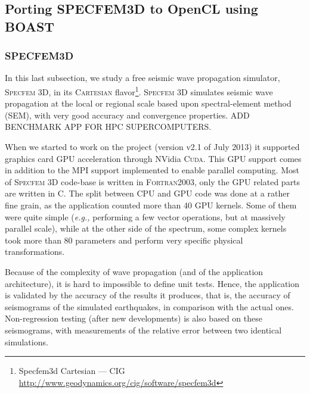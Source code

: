 \newcommand{\productname}[1]{\textsc{#1}}
\newcommand{\latin}[1]{\textit{#1}}

\newcommand{\Specfem}{\productname{Specfem 3D}\xspace}
\newcommand{\Cuda}{\productname{Cuda}\xspace}
\newcommand{\eg}{\latin{e.g.,}\xspace}
\newcommand{\OCL}{\productname{OpenCL}\xspace}
\newcommand{\code}[1]{\texttt{#1}}

\newcommand{\etc}[1]{\latin{etc}}


\subsection{Porting SPECFEM3D to OpenCL using BOAST}

\subsubsection{SPECFEM3D}

In this last subsection, we study a free seismic wave propagation
simulator, \Specfem, in its \productname{Cartesian}
flavor\footnote{Specfem3d Cartesian --- CIG
  \url{http://www.geodynamics.org/cig/software/specfem3d}}. \Specfem
simulates seismic wave propagation at the local or regional scale
based upon spectral-element method (SEM), with very good accuracy and
convergence properties. ADD BENCHMARK APP FOR HPC SUPERCOMPUTERS.

When we started to work on the project (version v2.1 of July 2013) it
supported graphics card GPU acceleration through NVidia \Cuda. This
GPU support comes in addition to the MPI support implemented to enable
parallel computing. Most of \Specfem code-base is written in
\productname{Fortran2003}, only the GPU related parts are written in
C.  The split between CPU and GPU code was done at a rather fine
grain, as the application counted more than 40 GPU kernels. Some of
them were quite simple (\eg performing a few vector operations, but at
massively parallel scale), while at the other side of the spectrum,
some complex kernels took more than 80 parameters and perform very
specific physical transformations.

Because of the complexity of wave propagation (and of the application
architecture), it is hard to impossible to define unit tests. Hence,
the application is validated by the accuracy of the results it
produces, that is, the accuracy of seismograms of the simulated
earthquakes, in comparison with the actual ones. Non-regression
testing (after new developments) is also based on these seismograms,
with measurements of the relative error between two identical
simulations.


